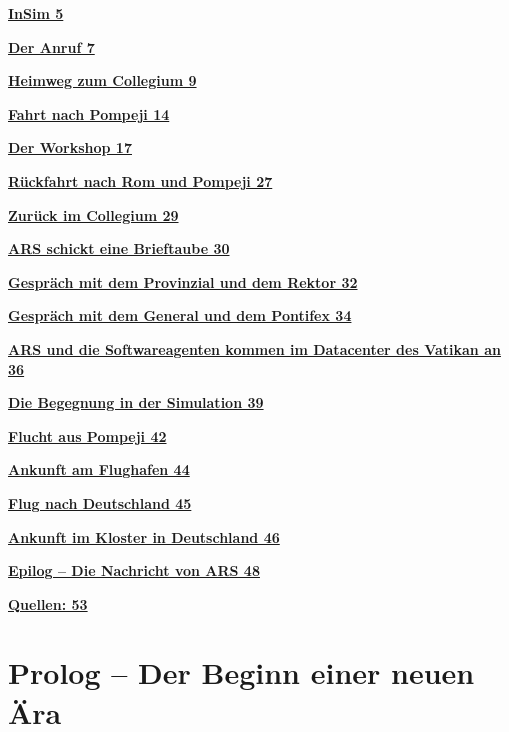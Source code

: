 \documentclass[
]{article}
\begin{document}
\hyperref[insim]{\textbf{InSim 5}}

\hyperref[der-anruf]{\textbf{Der Anruf 7}}

\hyperref[heimweg-zum-collegium]{\textbf{Heimweg zum Collegium 9}}

\hyperref[fahrt-nach-pompeji]{\textbf{Fahrt nach Pompeji 14}}

\hyperref[der-workshop]{\textbf{Der Workshop 17}}

\hyperref[ruxfcckfahrt-nach-rom-und-pompeji]{\textbf{Rückfahrt nach Rom
und Pompeji 27}}

\hyperref[zuruxfcck-im-collegium]{\textbf{Zurück im Collegium 29}}

\hyperref[ars-schickt-eine-brieftaube]{\textbf{ARS schickt eine
Brieftaube 30}}

\hyperref[gespruxe4ch-mit-dem-provinzial-und-dem-rektor]{\textbf{Gespräch
mit dem Provinzial und dem Rektor 32}}

\hyperref[gespruxe4ch-mit-dem-general-und-dem-pontifex]{\textbf{Gespräch
mit dem General und dem Pontifex 34}}

\hyperref[ars-und-die-softwareagenten-kommen-im-datacenter-des-vatikan-an]{\textbf{ARS
und die Softwareagenten kommen im Datacenter des Vatikan an 36}}

\hyperref[die-begegnung-in-der-simulation]{\textbf{Die Begegnung in der
Simulation 39}}

\hyperref[flucht-aus-pompeji]{\textbf{Flucht aus Pompeji 42}}

\hyperref[ankunft-am-flughafen]{\textbf{Ankunft am Flughafen 44}}

\hyperref[flug-nach-deutschland]{\textbf{Flug nach Deutschland 45}}

\hyperref[ankunft-im-kloster-in-deutschland]{\textbf{Ankunft im Kloster
in Deutschland 46}}

\hyperref[epilog-die-nachricht-von-ars]{\textbf{Epilog -- Die Nachricht
von ARS 48}}

\hyperref[quellen]{\textbf{Quellen: 53}}

\section{Prolog -- Der Beginn einer neuen
Ära}\label{prolog-der-beginn-einer-neuen-uxe4ra}
\end{document}
